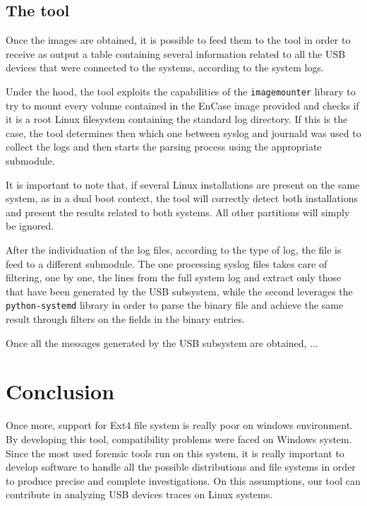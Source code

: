 \documentclass[a4paper]{article}
\begin{document}
\subsection{The tool}\label{sec:tool}
Once the images are obtained, it is possible to feed them to the tool in order
to receive as output a table containing several information related to all the
USB devices that were connected to the systems, according to the system logs.

Under the hood, the tool exploits the capabilities of the \texttt{imagemounter}
library to try to mount every volume contained in the EnCase image provided and
checks if it is a root Linux filesystem containing the standard log directory.
If this is the case, the tool determines then which one between syslog and
journald was used to collect the logs and then starts the parsing process using
the appropriate submodule.

It is important to note that, if several Linux installations are present on the
same system, as in a dual boot context, the tool will correctly detect both
installations and present the results related to both systems. All other
partitions will simply be ignored.

After the individuation of the log files, according to the type of log, the file
is feed to a different submodule. The one processing syslog files takes care of
filtering, one by one, the lines from the full system log and extract only those
that have been generated by the USB subsystem, while the second leverages the
\texttt{python-systemd} library in order to parse the binary file and achieve
the same result through filters on the fields in the binary entries.

Once all the messages generated by the USB subsystem are obtained, ...

\section{Conclusion}
\label{sec:concl}
Once more, support for Ext4 file system is really poor on windows environment.
By developing this tool, compatibility problems were faced on Windows system.
Since the most used forensic tools run on this system, it is really important to
develop software to handle all the possible distributions and file systems in
order to produce precise and complete investigations. On this assumptions, our
tool can contribute in analyzing USB devices traces on Linux systems.
\end{document}

